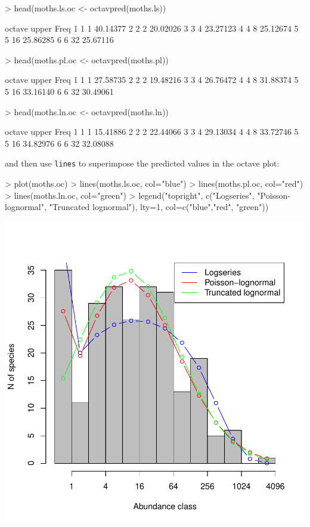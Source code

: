\documentclass[11pt, A4]{article}
\newcommand{\code}[1]{\texttt{#1}}
\begin{document}
\begin{Schunk}
\begin{Sinput}
> head(moths.ls.oc <- octavpred(moths.ls))
\end{Sinput}
\begin{Soutput}
  octave upper     Freq
1      1     1 40.14377
2      2     2 20.02026
3      3     4 23.27123
4      4     8 25.12674
5      5    16 25.86285
6      6    32 25.67116
\end{Soutput}
\begin{Sinput}
> head(moths.pl.oc <- octavpred(moths.pl))
\end{Sinput}
\begin{Soutput}
  octave upper     Freq
1      1     1 27.58735
2      2     2 19.48216
3      3     4 26.76472
4      4     8 31.88374
5      5    16 33.16140
6      6    32 30.49061
\end{Soutput}
\begin{Sinput}
> head(moths.ln.oc <- octavpred(moths.ln))
\end{Sinput}
\begin{Soutput}
  octave upper     Freq
1      1     1 15.41886
2      2     2 22.44066
3      3     4 29.13034
4      4     8 33.72746
5      5    16 34.82976
6      6    32 32.08088
\end{Soutput}
\end{Schunk}


and then use \code{lines} to superimpose the predicted values in the octave plot:

\begin{Schunk}
\begin{Sinput}
> plot(moths.oc)
> lines(moths.ls.oc, col="blue")
> lines(moths.pl.oc, col="red")
> lines(moths.ln.oc, col="green")
> legend("topright", 
        c("Logseries", "Poisson-lognormal", "Truncated lognormal"), 
        lty=1, col=c("blue","red", "green"))
\end{Sinput}
\end{Schunk}
\includegraphics{sads_quick_reference-Octaves-plot}
\end{document}
